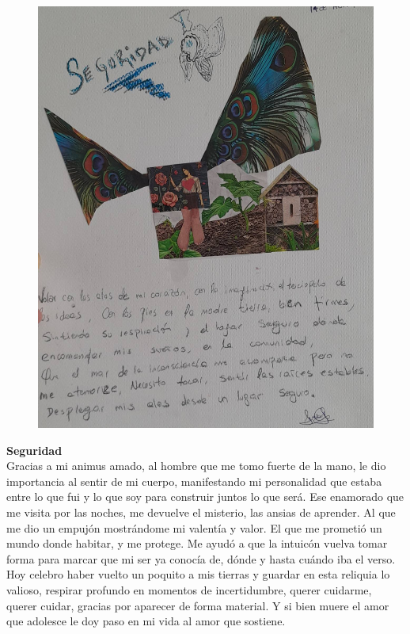 \documentclass[12pt, a4paper, twoside]{book} %
\begin{document}
\begin{figure}[H]
	\centering
	\includegraphics[width=\textwidth]{./images/1f81324df158d6.jpg}
\end{figure}

\clearpage

\noindent\textbf{Seguridad}\\
Gracias a mi animus amado, al hombre que me tomo fuerte de la mano, le dio importancia al sentir de mi cuerpo, manifestando mi personalidad que estaba entre lo que fui y lo que soy para construir juntos lo que será.
Ese enamorado que me visita por las noches, me devuelve el misterio, las ansias de aprender.
Al que me dio un empujón mostrándome mi valentía y valor.
El que me prometió un mundo donde habitar, y me protege.
Me ayudó a que la intuicón vuelva tomar forma para marcar que mi ser ya conocía de, dónde y hasta cuándo iba el verso.
Hoy celebro haber vuelto un poquito a mis tierras y guardar en esta reliquia lo valioso, respirar profundo en momentos de incertidumbre, querer cuidarme, querer cuidar, gracias por aparecer de forma material.
Y si bien muere el amor que adolesce le doy paso en mi vida al amor que sostiene.
\end{document}
